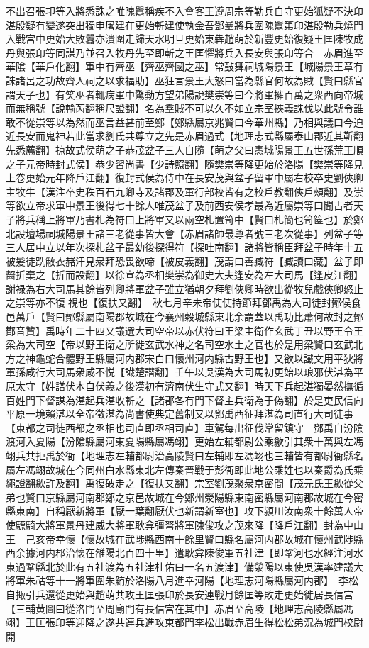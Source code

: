 不出召張卭等入將悉誅之唯隗囂稱疾不入會客王遵周宗等勒兵自守更始狐疑不決卬湛殷疑有變遂突出獨申屠建在更始斬建使執金吾鄧曅將兵圍隗囂第卬湛殷勒兵燒門入戰宫中更始大敗囂亦潰圍走歸天水明旦更始東犇趙萌於新豐更始復疑王匡陳牧成丹與張卬等同謀乃並召入牧丹先至即斬之王匡懼將兵入長安與張卬等合　赤眉進至華隂【華戶化翻】軍中有齊巫【齊巫齊國之巫】常鼔舞祠城陽景王【城陽景王章有誅諸呂之功故齊人祠之以求福助】巫狂言景王大怒曰當為縣官何故為賊【賢曰縣官謂天子也】有笑巫者輒病軍中驚動方望弟陽說樊崇等曰今將軍擁百萬之衆西向帝城而無稱號【說輸芮翻稱尺證翻】名為羣賊不可以久不如立宗室挾義誅伐以此號令誰敢不從崇等以為然而巫言益甚前至鄭【鄭縣屬京兆賢曰今華州縣】乃相與議曰今迫近長安而鬼神若此當求劉氏共尊立之先是赤眉過式【地理志式縣屬泰山郡近其靳翻先悉薦翻】掠故式侯萌之子恭茂盆子三人自隨【萌之父曰憲城陽景王五世孫荒王順之子元帝時封式侯】恭少習尚書【少詩照翻】隨樊崇等降更始於洛陽【樊崇等降見上卷更始元年降戶江翻】復封式侯為侍中在長安茂與盆子留軍中屬右校卒史劉俠卿主牧牛【漢注卒史秩百石九卿寺及諸郡及軍行部校皆有之校戶教翻俠戶頰翻】及崇等欲立帝求軍中景王後得七十餘人唯茂盆子及前西安侯孝最為近屬崇等曰聞古者天子將兵稱上將軍乃書札為符曰上將軍又以兩空札置笥中【賢曰札簡也笥箧也】於鄭北設壇場祠城陽景王諸三老從事皆大會【赤眉諸帥最尊者號三老次從事】列盆子等三人居中立以年次探札盆子最幼後探得符【探吐南翻】諸將皆稱臣拜盆子時年十五被髪徒跣敝衣赭汗見衆拜恐畏欲啼【被皮義翻】茂謂曰善臧符【臧讀曰藏】盆子即齧折棄之【折而設翻】以徐宣為丞相樊崇為御史大夫逢安為左大司馬【逢皮江翻】謝禄為右大司馬其餘皆列卿將軍盆子雖立猶朝夕拜劉俠卿時欲出從牧兒戲俠卿怒止之崇等亦不復視也【復扶又翻】　秋七月辛未帝使使持節拜鄧禹為大司徒封鄼侯食邑萬戶【賢曰鄼縣屬南陽郡故城在今襄州穀城縣東北余謂蓋以禹功比蕭何故封之鄼鄼音贊】禹時年二十四又議選大司空帝以赤伏符曰王梁主衛作玄武丁丑以野王令王梁為大司空【帝以野王衛之所徙玄武水神之名司空水土之官也於是用梁賢曰玄武北方之神龜蛇合體野王縣屬河内郡宋白曰懷州河内縣古野王也】又欲以䜟文用平狄將軍孫咸行大司馬衆咸不悦【䜟楚譛翻】壬午以吳漢為大司馬初更始以琅邪伏湛為平原太守【姓譜伏本自伏羲之後漢初有濟南伏生守式又翻】時天下兵起湛獨晏然撫循百姓門下督謀為湛起兵湛收斬之【諸郡各有門下督主兵衛為于偽翻】於是吏民信向平原一境賴湛以全帝徵湛為尚書使典定舊制又以鄧禹西征拜湛為司直行大司徒事【東都之司徒西都之丞相也司直即丞相司直】車駕每出征伐常留鎮守　鄧禹自汾隂渡河入夏陽【汾隂縣屬河東夏陽縣屬馮翊】更始左輔都尉公乘歙引其衆十萬與左馮翊兵共拒禹於衙【地理志左輔都尉治高陵賢曰左輔即左馮翊也三輔皆有都尉衙縣名屬左馮翊故城在今同州白水縣東北左傳秦晉戰于彭衙即此地公乘姓也以秦爵為氏乘繩證翻歙許及翻】禹復破走之【復扶又翻】宗室劉茂聚衆京密間【茂元氏王歙從父弟也賢曰京縣屬河南郡鄭之京邑故城在今鄭州滎陽縣東南密縣屬河南郡故城在今密縣東南】自稱厭新將軍【厭一葉翻厭伏也新謂新室也】攻下潁川汝南衆十餘萬人帝使驃騎大將軍景丹建威大將軍耿弇彊弩將軍陳俊攻之茂來降【降戶江翻】封為中山王　己亥帝幸懷【懷故城在武陟縣西南十餘里賢曰縣名屬河内郡故城在懷州武陟縣西余據河内郡治懷在雒陽北百四十里】遣耿弇陳俊軍五社津【即鞏河也水經注河水東過鞏縣北於此有五社渡為五社津杜佑曰一名五渡津】備滎陽以東使吳漢率建議大將軍朱祜等十一將軍圍朱鮪於洛陽八月進幸河陽【地理志河陽縣屬河内郡】　李松自掫引兵還從更始與趙萌共攻王匡張卬於長安連戰月餘匡等敗走更始徙居長信宫【三輔黄圖曰從洛門至周廟門有長信宫在其中】赤眉至高陵【地理志高陵縣屬馮翊】王匡張卬等迎降之遂共連兵進攻東都門李松出戰赤眉生得松松弟況為城門校尉開